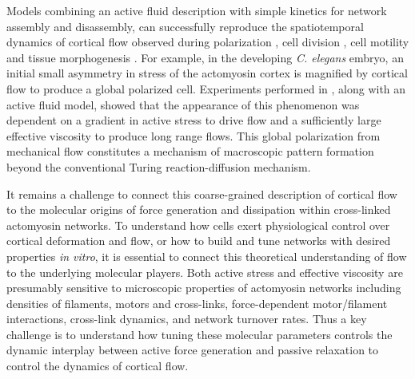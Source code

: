 Models combining an active fluid description with simple kinetics for network assembly and disassembly, can successfully reproduce the spatiotemporal dynamics of cortical flow observed during polarization \cite{cellmech_flows}, cell division \cite{Turlier2014114,PhysRevLett.103.058102}, cell motility \cite{Keren:2009aa,RevModPhys.85.1143} and tissue morphogenesis \cite{Behrndt257}.  For example, in the developing \textit{C. elegans} embryo, an initial small asymmetry in stress of the actomyosin cortex is magnified by cortical flow to produce a global polarized cell\cite{Munro2004413}.  Experiments performed in \cite{cellmech_flows}, along with an active fluid model, showed that the appearance of this phenomenon was dependent on a gradient in active stress to drive flow and a sufficiently large effective viscosity to produce long range flows. This global polarization from mechanical flow constitutes a mechanism of macroscopic pattern formation beyond the conventional Turing reaction-diffusion mechanism\cite{Howard2011}. 

It remains a challenge to connect this coarse-grained description of cortical flow to the molecular origins of force generation and dissipation within cross-linked actomyosin networks.  To  understand how cells exert physiological control over cortical deformation and flow, or how to build and tune networks with desired properties \textit{in vitro}, it is essential to connect this theoretical understanding of flow to the underlying molecular players.  Both active stress and effective viscosity are presumably sensitive to microscopic properties of actomyosin networks including densities of filaments, motors and cross-links, force-dependent motor/filament interactions, cross-link dynamics, and network turnover rates.  Thus a key challenge is to understand how tuning these molecular parameters controls the dynamic interplay between active force generation and passive relaxation to control the dynamics of cortical flow.


